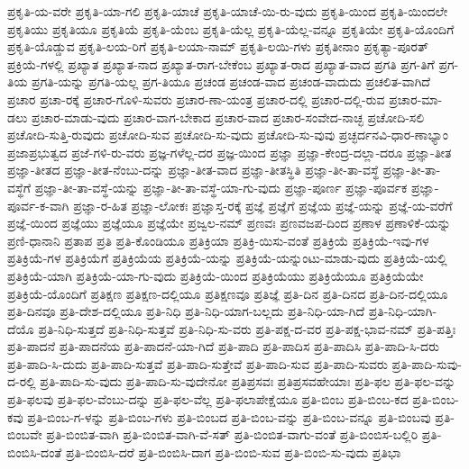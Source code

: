 {ಪ್ರಕೃತಿ-ಯ-ವರೇ
ಪ್ರಕೃತಿ-ಯಾ-ಗಲಿ
ಪ್ರಕೃತಿ-ಯಾಚೆ
ಪ್ರಕೃತಿ-ಯಾಚೆ-ಯಿ-ರು-ವುದು
ಪ್ರಕೃತಿ-ಯಿಂದ
ಪ್ರಕೃತಿ-ಯಿಂದಲೇ
ಪ್ರಕೃತಿಯು
ಪ್ರಕೃತಿಯೂ
ಪ್ರಕೃತಿಯೆ
ಪ್ರಕೃತಿ-ಯೆಂಬ
ಪ್ರಕೃತಿ-ಯೆಲ್ಲ
ಪ್ರಕೃತಿ-ಯೆಲ್ಲ-ವನ್ನೂ
ಪ್ರಕೃತಿಯೇ
ಪ್ರಕೃತಿ-ಯೊಂದಿಗೆ
ಪ್ರಕೃತಿ-ಯೊಡ್ಡುವ
ಪ್ರಕೃತಿ-ಲಯ-ರಿಗೆ
ಪ್ರಕೃತಿ-ಲಯಾ-ನಾಮ್
ಪ್ರಕೃತಿ-ಲಯಿ-ಗಳು
ಪ್ರಕೃತೀನಾಂ
ಪ್ರಕೃತ್ಯಾ-ಪೂರತ್
ಪ್ರಕ್ರಿಯೆ-ಗಳಲ್ಲಿ
ಪ್ರಖ್ಯಾತ
ಪ್ರಖ್ಯಾತ-ನಾದ
ಪ್ರಖ್ಯಾತ-ರಾಗ-ಬೇಕೆಂಬ
ಪ್ರಖ್ಯಾತ-ರಾದ
ಪ್ರಖ್ಯಾತ-ವಾದ
ಪ್ರಗತಿ
ಪ್ರಗ-ತಿಗೆ
ಪ್ರಗ-ತಿಯ
ಪ್ರಗತಿ-ಯನ್ನು
ಪ್ರಗತಿ-ಯಲ್ಲ
ಪ್ರಗ-ತಿಯೂ
ಪ್ರಚಂಡ
ಪ್ರಚಂಡ-ವಾದ
ಪ್ರಚಂಡ-ವಾದುದು
ಪ್ರಚಲಿತ-ವಾಗಿದೆ
ಪ್ರಚಾರ
ಪ್ರಚಾ-ರಕ್ಕೆ
ಪ್ರಚಾರ-ಗೊಳಿ-ಸುವರು
ಪ್ರಚಾರ-ಣಾ-ಯಂತ್ರ
ಪ್ರಚಾರ-ದಲ್ಲಿ
ಪ್ರಚಾರ-ದಲ್ಲಿ-ರುವ
ಪ್ರಚಾರ-ಮಾ-ಡಲು
ಪ್ರಚಾರ-ಮಾಡು-ವುದು
ಪ್ರಚಾರ-ವಾಗ-ಬೇಕಾದ
ಪ್ರಚಾರ-ವಾದ
ಪ್ರಚಾರ-ಸಂವೇದ-ನಾಚ್ಛ
ಪ್ರಚೋದಿ-ಸಲಿ
ಪ್ರಚೋದಿ-ಸುತ್ತಿ-ರುವುದು
ಪ್ರಚೋದಿ-ಸುವ
ಪ್ರಚೋದಿ-ಸು-ವುದು
ಪ್ರಚೋದಿ-ಸು-ವುವು
ಪ್ರಚ್ಛರ್ದನವಿ-ಧಾರ-ಣಾಭ್ಯಾಂ
ಪ್ರಜಾಪ್ರಭುತ್ವದ
ಪ್ರಜೆ-ಗಳಿ-ರು-ವರು
ಪ್ರಜ್ಞ-ಗಳೆಲ್ಲ-ದರ
ಪ್ರಜ್ಞ-ಯಿಂದ
ಪ್ರಜ್ಞಾ
ಪ್ರಜ್ಞಾ-ಕೇಂದ್ರ-ದಲ್ಲಾ-ದರೂ
ಪ್ರಜ್ಞಾ-ತೀತ
ಪ್ರಜ್ಞಾ-ತೀತದ
ಪ್ರಜ್ಞಾ-ತೀತ-ನೆಂಬು-ದನ್ನು
ಪ್ರಜ್ಞಾ-ತೀತ-ವಾದ
ಪ್ರಜ್ಞಾ-ತೀತಸ್ಥಿತಿ
ಪ್ರಜ್ಞಾ-ತೀ-ತಾ-ವಸ್ಥೆ
ಪ್ರಜ್ಞಾ-ತೀ-ತಾ-ವಸ್ಥೆಗೆ
ಪ್ರಜ್ಞಾ-ತೀ-ತಾ-ವಸ್ಥೆ-ಯನ್ನು
ಪ್ರಜ್ಞಾ-ತೀ-ತಾ-ವಸ್ಥೆ-ಯಾ-ಗು-ವುದು
ಪ್ರಜ್ಞಾ-ಪೂರ್ಣ
ಪ್ರಜ್ಞಾ-ಪೂರ್ವಕ
ಪ್ರಜ್ಞಾ-ಪೂರ್ವ-ಕ-ವಾಗಿ
ಪ್ರಜ್ಞಾ-ರ-ಹಿತ
ಪ್ರಜ್ಞಾ-ಲೋಕಃ
ಪ್ರಜ್ಞಾಸ್ತ-ರಕ್ಕೆ
ಪ್ರಜ್ಞೆ
ಪ್ರಜ್ಞೆಗೆ
ಪ್ರಜ್ಞೆಯ
ಪ್ರಜ್ಞೆ-ಯನ್ನು
ಪ್ರಜ್ಞೆ-ಯ-ವರೆಗೆ
ಪ್ರಜ್ಞೆ-ಯಿಂದ
ಪ್ರಜ್ಞೆಯು
ಪ್ರಜ್ಞೆಯೂ
ಪ್ರಜ್ಞೆಯೇ
ಪ್ರಜ್ವಲ-ನಮ್
ಪ್ರಣವಃ
ಪ್ರಣವಜಪ-ದಿಂದ
ಪ್ರಣಾಳ
ಪ್ರಣಾಳಿಕೆ-ಯನ್ನು
ಪ್ರಣಿ-ಧಾನಾನಿ
ಪ್ರತಾಪ
ಪ್ರತಿ
ಪ್ರತಿ-ಕೊಂಡಿಯೂ
ಪ್ರತಿಕ್ರಿಯಾ
ಪ್ರತಿಕ್ರಿ-ಯಿಸು-ವಂತೆ
ಪ್ರತಿಕ್ರಿಯೆ
ಪ್ರತಿಕ್ರಿಯೆ-ಇವು-ಗಳ
ಪ್ರತಿಕ್ರಿಯೆ-ಗಳ
ಪ್ರತಿಕ್ರಿಯೆಗೆ
ಪ್ರತಿಕ್ರಿಯೆಯ
ಪ್ರತಿಕ್ರಿಯೆ-ಯನ್ನು
ಪ್ರತಿಕ್ರಿಯೆ-ಯನ್ನುಂಟು-ಮಾಡು-ವುದು
ಪ್ರತಿಕ್ರಿಯೆ-ಯಲ್ಲಿ
ಪ್ರತಿಕ್ರಿಯೆ-ಯಾಗಿ
ಪ್ರತಿಕ್ರಿಯೆ-ಯಾ-ಗು-ವುದು
ಪ್ರತಿಕ್ರಿಯೆ-ಯಿಂದ
ಪ್ರತಿಕ್ರಿಯೆಯು
ಪ್ರತಿಕ್ರಿಯೆಯೂ
ಪ್ರತಿಕ್ರಿಯೆಯೇ
ಪ್ರತಿಕ್ರಿಯೆ-ಯೊಂದಿಗೆ
ಪ್ರತಿಕ್ಷಣ
ಪ್ರತಿಕ್ಷಣ-ದಲ್ಲಿಯೂ
ಪ್ರತಿಕ್ಷಣವೂ
ಪ್ರತಿಜ್ಞೆ
ಪ್ರತಿ-ದಿನ
ಪ್ರತಿ-ದಿನದ
ಪ್ರತಿ-ದಿನ-ದಲ್ಲಿಯೂ
ಪ್ರತಿ-ದಿನವೂ
ಪ್ರತಿ-ದೇಶ-ದಲ್ಲಿಯೂ
ಪ್ರತಿ-ನಿಧಿ
ಪ್ರತಿ-ನಿಧಿ-ಯಾಗ-ಬಲ್ಲದು
ಪ್ರತಿ-ನಿಧಿ-ಯಾ-ಗಿದೆ
ಪ್ರತಿ-ನಿಧಿ-ಯಾಗಿ-ದೆಯೊ
ಪ್ರತಿ-ನಿಧಿ-ಸುತ್ತದೆ
ಪ್ರತಿ-ನಿಧಿ-ಸುತ್ತವೆ
ಪ್ರತಿ-ನಿಧಿ-ಸು-ವರು
ಪ್ರತಿ-ಪಕ್ಷ-ದ-ವರ
ಪ್ರತಿ-ಪಕ್ಷ-ಭಾವ-ನಮ್
ಪ್ರತಿ-ಪತ್ತಿಃ
ಪ್ರತಿ-ಪಾದನೆ
ಪ್ರತಿ-ಪಾದನೆಯ
ಪ್ರತಿ-ಪಾದನೆ-ಯಾ-ಗಿದೆ
ಪ್ರತಿ-ಪಾದಿ
ಪ್ರತಿ-ಪಾದಿಸ
ಪ್ರತಿ-ಪಾದಿಸಿ
ಪ್ರತಿ-ಪಾದಿ-ಸಿ-ದರು
ಪ್ರತಿ-ಪಾದಿ-ಸಿ-ದುದು
ಪ್ರತಿ-ಪಾದಿ-ಸುತ್ತವೆ
ಪ್ರತಿ-ಪಾದಿ-ಸುತ್ತೇವೆ
ಪ್ರತಿ-ಪಾದಿ-ಸುವ
ಪ್ರತಿ-ಪಾದಿ-ಸುವರು
ಪ್ರತಿ-ಪಾದಿ-ಸುವು-ದ-ರಲ್ಲಿ
ಪ್ರತಿ-ಪಾದಿ-ಸು-ವುದು
ಪ್ರತಿ-ಪಾದಿ-ಸು-ವುದೇನೋ
ಪ್ರತಿಪ್ರಸವಃ
ಪ್ರತಿಪ್ರಸವಹೇಯಾಃ
ಪ್ರತಿ-ಫಲ
ಪ್ರತಿ-ಫಲ-ವನ್ನು
ಪ್ರತಿ-ಫಲವು
ಪ್ರತಿ-ಫಲ-ವೆಂಬು-ದನ್ನು
ಪ್ರತಿ-ಫಲ-ವೆಲ್ಲ
ಪ್ರತಿ-ಫಲಾಪೇಕ್ಷೆಯೂ
ಪ್ರತಿ-ಬಿಂಬ
ಪ್ರತಿ-ಬಿಂಬ-ಕದ
ಪ್ರತಿ-ಬಿಂಬ-ಕವು
ಪ್ರತಿ-ಬಿಂಬ-ಗ-ಳನ್ನು
ಪ್ರತಿ-ಬಿಂಬ-ಗಳು
ಪ್ರತಿ-ಬಿಂಬದ
ಪ್ರತಿ-ಬಿಂಬ-ವನ್ನು
ಪ್ರತಿ-ಬಿಂಬ-ವನ್ನೂ
ಪ್ರತಿ-ಬಿಂಬವು
ಪ್ರತಿ-ಬಿಂಬವೇ
ಪ್ರತಿ-ಬಿಂಬಿತ-ವಾಗಿ
ಪ್ರತಿ-ಬಿಂಬಿತ-ವಾಗಿ-ವೆ-ಸತ್
ಪ್ರತಿ-ಬಿಂಬಿತ-ವಾಗು-ವಂತೆ
ಪ್ರತಿ-ಬಿಂಬಿಸ-ಬಲ್ಲಿರಿ
ಪ್ರತಿ-ಬಿಂಬಿಸಿ-ದಂತೆ
ಪ್ರತಿ-ಬಿಂಬಿಸಿ-ದರೆ
ಪ್ರತಿ-ಬಿಂಬಿಸಿ-ದಾಗ
ಪ್ರತಿ-ಬಿಂಬಿ-ಸುವ
ಪ್ರತಿ-ಬಿಂಬಿ-ಸು-ವುದು
ಪ್ರತಿಭಾ
}
